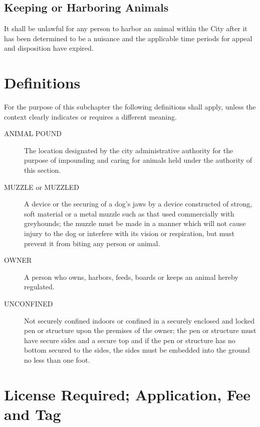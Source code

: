\subsection{Keeping or Harboring Animals}
It shall be unlawful for any person to harbor an animal within the City after it has been determined to be a nuisance and the applicable time periods for appeal and disposition have expired.\\


\setcounter{section}{14}
\section{Definitions}
For the purpose of this subchapter the following definitions shall apply, unless the context clearly indicates or requires a different meaning.
\begin{description}
    \item[ANIMAL POUND] The location designated by the city administrative authority for the purpose of impounding and caring for animals held under the authority of this section.
    \item[MUZZLE or MUZZLED] A device or the securing of a dog’s jaws by a device constructed of strong, soft material or a metal muzzle such as that used commercially with greyhounds; the muzzle must be made in a manner which will not cause injury to the dog or interfere with its vision or respiration, but must prevent it from biting any person or animal.
    \item[OWNER] A person who owns, harbors, feeds, boards or keeps an animal hereby regulated.
    \item[UNCONFINED] Not securely confined indoors or confined in a securely enclosed and locked pen or structure upon the premises of the owner; the pen or structure must have secure sides and a secure top and if the pen or structure has no bottom secured to the sides, the sides must be embedded into the ground no less than one foot.
\end{description}

\section{License Required; Application, Fee and Tag}

